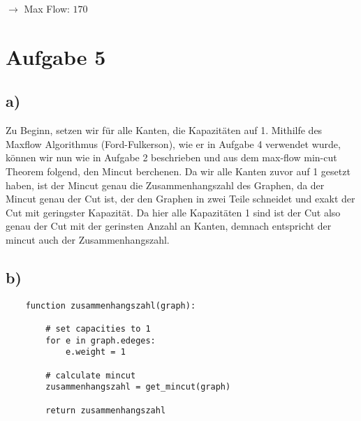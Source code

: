 \documentclass[a4paper]{scrartcl}
\begin{document}
\begin{center}
\end{center}

$\rightarrow$ Max Flow: $170$


\section*{Aufgabe 5}
\subsection*{a)}
Zu Beginn, setzen wir für alle Kanten, die Kapazitäten auf 1. Mithilfe des Maxflow Algorithmus (Ford-Fulkerson), wie er in Aufgabe 4 verwendet wurde, können wir nun wie in Aufgabe 2 beschrieben und aus dem max-flow min-cut Theorem folgend, den Mincut berchenen. Da wir alle Kanten zuvor auf 1 gesetzt haben, ist der Mincut genau die Zusammenhangszahl des Graphen, da der Mincut genau der Cut ist, der den Graphen in zwei Teile schneidet und exakt der Cut mit geringster Kapazität. Da hier alle Kapazitäten 1 sind ist der Cut also genau der Cut mit der gerinsten Anzahl an Kanten, demnach entspricht der mincut auch der Zusammenhangszahl.



\subsection*{b)}
\begin{lstlisting}
	function zusammenhangszahl(graph):
		
		# set capacities to 1
		for e in graph.edeges:
			e.weight = 1
		
		# calculate mincut
		zusammenhangszahl = get_mincut(graph)
		
		return zusammenhangszahl

\end{lstlisting}
\end{document}
